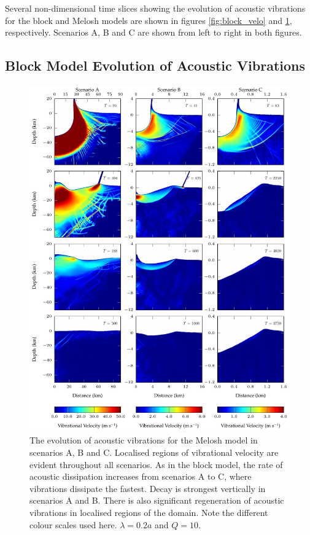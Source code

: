 Several non-dimensional time slices showing the evolution of acoustic vibrations for the block and Melosh models are shown in figures \ref{fig:block_velo} and \ref{fig:melosh_velo}, respectively. Scenarios A, B and C are shown from left to right in both figures.

\subsection{Block Model Evolution of Acoustic Vibrations}\label{sec:blockvelo}

\begin{figure}[!b]
\centering
\includegraphics[width=0.7\linewidth]{./images/melosh_velo.pdf}
\caption{The evolution of acoustic vibrations for the Melosh model in scenarios A, B and C. Localised regions of vibrational velocity are evident throughout all scenarios. As in the block model, the rate of acoustic dissipation increases from scenarios A to C, where vibrations dissipate the fastest. Decay is strongest vertically in scenarios A and B. There is also significant regeneration of acoustic vibrations in localised regions of the domain. Note the different colour scales used here. $\lambda=0.2a$ and $Q=10$. \label{fig:melosh_velo}}
\end{figure}

